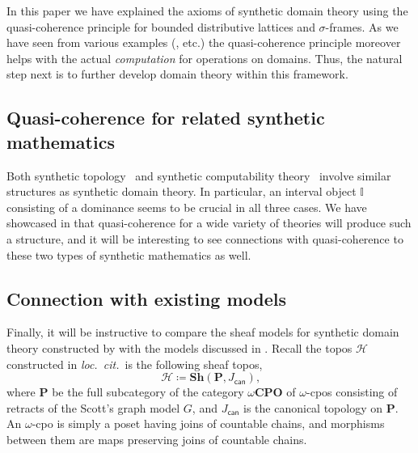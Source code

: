 \documentclass[a4paper,12pt]{amsart}
\theoremstyle{definition}
\newcommand{\mc}[1]{\mathcal{#1}}
\newcommand{\mb}[1]{\mathbf{#1}}
\newcommand{\mbb}[1]{\mathbb{#1}}
\newcommand{\I}{\mbb I}
\newcommand{\ms}[1]{\mathsf{#1}}
\newcommand{\sh}{\mb{Sh}}
\newcommand{\wCPO}{\omega\mb{CPO}}
\begin{document}
In this paper we have explained the axioms of synthetic domain theory using the quasi-coherence principle for bounded distributive lattices and $\sigma$-frames. As we have seen from various examples (,  etc.) the quasi-coherence principle moreover helps with the actual \emph{computation} for operations on domains. Thus, the natural step next is to further develop domain theory within this framework.


\subsection{Quasi-coherence for related synthetic mathematics}

Both synthetic topology~\citep{bauer2009dedekind} and synthetic computability theory~\citep{RN552} involve similar structures as synthetic domain theory. In particular, an interval object $\I$ consisting of a dominance seems to be crucial in all three cases. We have showcased in  that quasi-coherence for a wide variety of theories will produce such a structure, and it will be interesting to see connections with quasi-coherence to these two types of synthetic mathematics as well.

\subsection{Connection with existing models}\label{subsec:compare}

Finally, it will be instructive to compare the sheaf models for synthetic domain theory constructed by \citet{FIORE1997151} with the models discussed in . Recall the topos $\mc H$ constructed in \emph{loc.\ cit.}\ is the following sheaf topos,
\[ \mc H \coloneq \sh(\mb P,J_{\ms{can}})\text{,} \]
where $\mb P$ be the full subcategory of the category $\wCPO$ of $\omega$-cpos consisting of retracts of the Scott's graph model $G$, and $J_{\ms{can}}$ is the canonical topology on $\mb P$. An $\omega$-cpo is simply a poset having joins of countable chains, and morphisms between them are maps preserving joins of countable chains.
\end{document}

